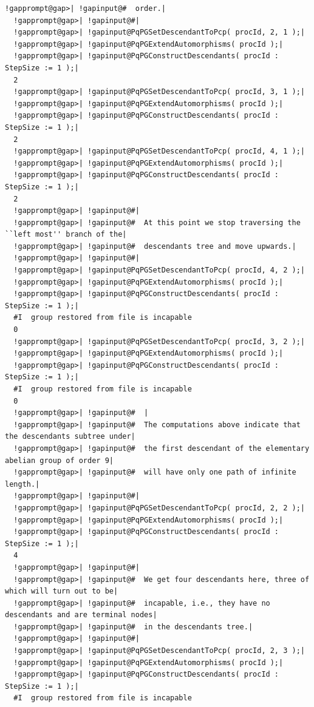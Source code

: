\documentclass[a4paper,11pt]{report}
\begin{document}
{{\begin{Verbatim}[commandchars=!@|,fontsize=\small,frame=single,label=Example]
  !gapprompt@gap>| !gapinput@#  order.|
  !gapprompt@gap>| !gapinput@#|
  !gapprompt@gap>| !gapinput@PqPGSetDescendantToPcp( procId, 2, 1 );|
  !gapprompt@gap>| !gapinput@PqPGExtendAutomorphisms( procId );|
  !gapprompt@gap>| !gapinput@PqPGConstructDescendants( procId : StepSize := 1 );|
  2
  !gapprompt@gap>| !gapinput@PqPGSetDescendantToPcp( procId, 3, 1 );|
  !gapprompt@gap>| !gapinput@PqPGExtendAutomorphisms( procId );|
  !gapprompt@gap>| !gapinput@PqPGConstructDescendants( procId : StepSize := 1 );|
  2
  !gapprompt@gap>| !gapinput@PqPGSetDescendantToPcp( procId, 4, 1 );|
  !gapprompt@gap>| !gapinput@PqPGExtendAutomorphisms( procId );|
  !gapprompt@gap>| !gapinput@PqPGConstructDescendants( procId : StepSize := 1 );|
  2
  !gapprompt@gap>| !gapinput@#|
  !gapprompt@gap>| !gapinput@#  At this point we stop traversing the ``left most'' branch of the|
  !gapprompt@gap>| !gapinput@#  descendants tree and move upwards.|
  !gapprompt@gap>| !gapinput@#|
  !gapprompt@gap>| !gapinput@PqPGSetDescendantToPcp( procId, 4, 2 );|
  !gapprompt@gap>| !gapinput@PqPGExtendAutomorphisms( procId );|
  !gapprompt@gap>| !gapinput@PqPGConstructDescendants( procId : StepSize := 1 );|
  #I  group restored from file is incapable
  0
  !gapprompt@gap>| !gapinput@PqPGSetDescendantToPcp( procId, 3, 2 );|
  !gapprompt@gap>| !gapinput@PqPGExtendAutomorphisms( procId );|
  !gapprompt@gap>| !gapinput@PqPGConstructDescendants( procId : StepSize := 1 );|
  #I  group restored from file is incapable
  0
  !gapprompt@gap>| !gapinput@#  |
  !gapprompt@gap>| !gapinput@#  The computations above indicate that the descendants subtree under|
  !gapprompt@gap>| !gapinput@#  the first descendant of the elementary abelian group of order 9|
  !gapprompt@gap>| !gapinput@#  will have only one path of infinite length.|
  !gapprompt@gap>| !gapinput@#|
  !gapprompt@gap>| !gapinput@PqPGSetDescendantToPcp( procId, 2, 2 );|
  !gapprompt@gap>| !gapinput@PqPGExtendAutomorphisms( procId );|
  !gapprompt@gap>| !gapinput@PqPGConstructDescendants( procId : StepSize := 1 );|
  4
  !gapprompt@gap>| !gapinput@#|
  !gapprompt@gap>| !gapinput@#  We get four descendants here, three of which will turn out to be|
  !gapprompt@gap>| !gapinput@#  incapable, i.e., they have no descendants and are terminal nodes|
  !gapprompt@gap>| !gapinput@#  in the descendants tree.|
  !gapprompt@gap>| !gapinput@#|
  !gapprompt@gap>| !gapinput@PqPGSetDescendantToPcp( procId, 2, 3 );|
  !gapprompt@gap>| !gapinput@PqPGExtendAutomorphisms( procId );|
  !gapprompt@gap>| !gapinput@PqPGConstructDescendants( procId : StepSize := 1 );|
  #I  group restored from file is incapable

\end{Verbatim}}}
\end{document}
